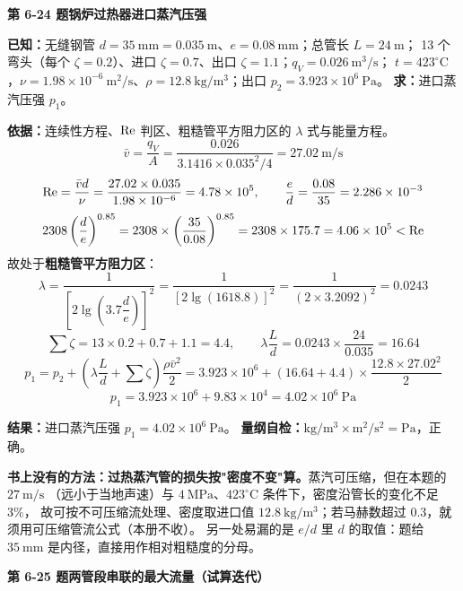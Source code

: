 \noindent\textbf{第 6-24 题\quad 锅炉过热器进口蒸汽压强}

\begin{jie}
\textbf{已知：}无缝钢管 $d=35\ \mathrm{mm}=0.035\ \mathrm{m}$、$e=0.08\ \mathrm{mm}$；总管长 $L=24\ \mathrm{m}$；
13 个弯头（每个 $\zeta=0.2$）、进口 $\zeta=0.7$、出口 $\zeta=1.1$；$q_V=0.026\ \mathrm{m^3/s}$；
$t=423^\circ\mathrm{C}$，$\nu=1.98\times10^{-6}\ \mathrm{m^2/s}$、$\rho=12.8\ \mathrm{kg/m^3}$；出口 $p_2=3.923\times10^6\ \mathrm{Pa}$。
\textbf{求：}进口蒸汽压强 $p_1$。

\textbf{依据：}连续性方程、$\mathrm{Re}$ 判区、粗糙管平方阻力区的 $\lambda$ 式与能量方程。
\[ \bar v=\frac{q_V}{A}=\frac{0.026}{3.1416\times0.035^2/4}=27.02\ \mathrm{m/s} \]
\[ \mathrm{Re}=\frac{\bar vd}{\nu}=\frac{27.02\times0.035}{1.98\times10^{-6}}=4.78\times10^5,\qquad
\frac ed=\frac{0.08}{35}=2.286\times10^{-3} \]
\[ 2308\left(\frac de\right)^{0.85}=2308\times\left(\frac{35}{0.08}\right)^{0.85}=2308\times175.7=4.06\times10^5<\mathrm{Re} \]
故处于\textbf{粗糙管平方阻力区}：
\[ \lambda=\frac{1}{\left[2\lg\left(3.7\dfrac de\right)\right]^2}
=\frac{1}{\left[2\lg(1618.8)\right]^2}=\frac{1}{(2\times3.2092)^2}=0.0243 \]
\[ \sum\zeta=13\times0.2+0.7+1.1=4.4,\qquad \lambda\frac Ld=0.0243\times\frac{24}{0.035}=16.64 \]
\[ p_1=p_2+\left(\lambda\frac Ld+\sum\zeta\right)\frac{\rho\bar v^2}{2}
=3.923\times10^6+(16.64+4.4)\times\frac{12.8\times27.02^2}{2} \]
\[ p_1=3.923\times10^6+9.83\times10^4=4.02\times10^6\ \mathrm{Pa} \]

\textbf{结果：}进口蒸汽压强 $p_1=4.02\times10^6\ \mathrm{Pa}$。
\textbf{量纲自检：}$\mathrm{kg/m^3\times m^2/s^2}=\mathrm{Pa}$，正确。
\end{jie}

\begin{tishi}
\textbf{书上没有的方法：过热蒸汽管的损失按"密度不变"算。}蒸汽可压缩，但在本题的 $27\ \mathrm{m/s}$
（远小于当地声速）与 $4\ \mathrm{MPa}$、$423^\circ\mathrm{C}$ 条件下，密度沿管长的变化不足 $3\%$，
故可按不可压缩流处理、密度取进口值 $12.8\ \mathrm{kg/m^3}$；若马赫数超过 0.3，就须用可压缩管流公式（本册不收）。
另一处易漏的是 $e/d$ 里 $d$ 的取值：题给 $35\ \mathrm{mm}$ 是内径，直接用作相对粗糙度的分母。
\end{tishi}

\noindent\textbf{第 6-25 题\quad 两管段串联的最大流量（试算迭代）}

